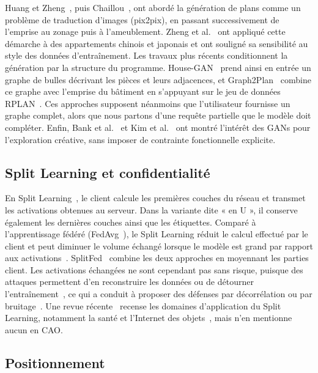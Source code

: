 \documentclass[twocolumn]{ICCKjournal}
\begin{document}
Huang et Zheng~\cite{Huang2018}, puis Chaillou~\cite{Chaillou2020ArchiGAN},
ont abordé la génération de plans comme un problème de traduction
d'images (pix2pix), en passant successivement de l'emprise au zonage
puis à l'ameublement. Zheng et al.~\cite{zheng2020apartment} ont appliqué
cette démarche à des appartements chinois et japonais et ont souligné sa
sensibilité au style des données d'entraînement. Les travaux plus
récents conditionnent la génération par la structure du programme.
House-GAN~\cite{Nauata2020HouseGAN} prend ainsi en entrée un graphe de
bulles décrivant les pièces et leurs adjacences, et
Graph2Plan~\cite{Hu2020Graph2Plan} combine ce graphe avec l'emprise du
bâtiment en s'appuyant sur le jeu de données RPLAN~\cite{Wu2019RPLAN}.
Ces approches supposent néanmoins que l'utilisateur fournisse un graphe
complet, alors que nous partons d'une requête partielle que le modèle
doit compléter. Enfin, Bank et al.~\cite{Bank2022} et
Kim et al.~\cite{kim2022placemakingai} ont montré l'intérêt des GANs pour
l'exploration créative, sans imposer de contrainte fonctionnelle
explicite.

\subsection{Split Learning et confidentialité}

En Split Learning~\cite{Gupta2018Distributed,Vepakomma2018Health}, le
client calcule les premières couches du réseau et transmet les
activations obtenues au serveur. Dans la variante dite « en U », il
conserve également les dernières couches ainsi que les étiquettes.
Comparé à l'apprentissage fédéré (FedAvg~\cite{McMahan2017FedAvg}), le
Split Learning réduit le calcul effectué par le client et peut diminuer
le volume échangé lorsque le modèle est grand par rapport aux
activations~\cite{Singh2019CommEfficiency}. SplitFed~\cite{thapa2022splitfed}
combine les deux approches en moyennant les parties client. Les
activations échangées ne sont cependant pas sans risque, puisque des
attaques permettent d'en reconstruire les données ou de détourner
l'entraînement~\cite{Pasquini2022,Gao2023PCAT,erdogan2022splitguard}, ce
qui a conduit à proposer des défenses par décorrélation ou par
bruitage~\cite{Vepakomma2020NoPeek}. Une revue récente~\cite{Hu2025SplitLearning}
recense les domaines d'application du Split Learning, notamment la santé
et l'Internet des objets~\cite{Samikwa2022ARES}, mais n'en mentionne
aucun en CAO.

\subsection{Positionnement}
\end{document}
